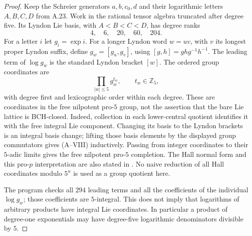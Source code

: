 \begin{proof}
Keep the Schreier generators $a,b,c_0,d$ and their logarithmic
letters $A,B,C,D$ from A.23. Work in the rational tensor
algebra truncated after degree five. Its Lyndon Lie basis,
with $A<B<C<D$, has degree ranks
\[
                 4,\quad6,\quad20,\quad60,\quad204.
                                                               \tag{A--VII}
\]
For a letter $i$ let $g_i=\exp i$. For a longer Lyndon word
$w=uv$, with $v$ its longest proper Lyndon suffix, define
$g_w=[g_u,g_v]$, using $[g,h]=ghg^{-1}h^{-1}$.
The leading term of $\log g_w$ is the standard Lyndon
bracket $[w]$. The ordered group coordinates are
\[
       \prod_{|w|\leq5}g_w^{t_w},\qquad t_w\in\mathbb Z_5,
                                                               \tag{A--VIII}
\]
with degree first and lexicographic order within each degree.
These are coordinates in the free nilpotent pro-$5$ group,
not the assertion that the bare Lie lattice is BCH-closed.
Indeed, collection in each lower-central quotient identifies
it with the free integral Lie component. Changing its basis
to the Lyndon brackets is an integral basis change; lifting
those basis elements by the displayed group commutators
gives (A--VIII) inductively. Passing from integer coordinates
to their $5$-adic limits gives the free nilpotent pro-$5$
completion. The Hall normal form and this pro-$p$
interpretation are also stated in
\citet[\S4, displayed normal form and Remark 4.1]{A_CasalsHall2018}.
No naive reduction of all Hall coordinates modulo $5^n$
is used as a group quotient here.

The program checks all $294$ leading terms and all the
coefficients of the individual $\log g_w$; those coefficients
are $5$-integral. This does not imply that logarithms of
arbitrary products have integral Lie coordinates.
In particular a product of degree-one exponentials may
have degree-five logarithmic denominators divisible by $5$.


\end{proof}
